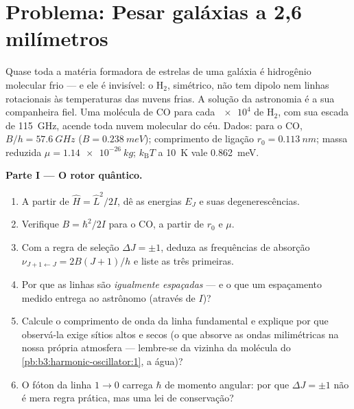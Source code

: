 \section{Problema: Pesar galáxias a 2,6 milímetros}

\begin{problem}\label{pb:b3:quantum-angular-momentum:1}
Quase toda a matéria formadora de estrelas de uma galáxia é hidrogênio
molecular frio --- e ele é invisível: o H$_2$, simétrico, não tem
dipolo nem linhas rotacionais às temperaturas das nuvens frias. A
solução da astronomia é a sua companheira fiel. Uma molécula de CO para
cada $\num{e4}$ de H$_2$, com sua escada de \qty{115}{GHz}, acende toda
nuvem molecular do céu. Dados: para o CO, $B/h = \qty{57.6}{GHz}$ ($B =
\qty{0.238}{meV}$); comprimento de ligação
$r_0 = \qty{0.113}{nm}$; massa reduzida $\mu = \qty{1.14e-26}{kg}$;
$k_{\text{B}}T$ a \qty{10}{K} vale \qty{0.862}{meV}.

\medskip\noindent\textbf{Parte I --- O rotor quântico.}
\begin{enumerate}
  \item A partir de $\hat H = \hat L^2/2I$, dê as energias $E_J$ e
        suas degenerescências.
  \item Verifique $B = \hbar^2/2I$ para o CO, a partir de $r_0$ e
        $\mu$.
  \item Com a regra de seleção $\Delta J = \pm1$, deduza as
        frequências de absorção $\nu_{J+1\leftarrow J} = 2B(J+1)/h$ e
        liste as três primeiras.
  \item Por que as linhas são \emph{igualmente espaçadas} --- e o que
        um espaçamento medido entrega ao astrônomo (através de $I$)?
  \item Calcule o comprimento de onda da linha fundamental e explique
        por que observá-la exige sítios altos e secos (o que absorve
        as ondas milimétricas na nossa própria atmosfera --- lembre-se
        da vizinha da molécula do
        \cref{pb:b3:harmonic-oscillator:1}, a água)?
  \item O fóton da linha $1 \to 0$ carrega $\hbar$ de momento angular:
        por que $\Delta J = \pm1$ não é mera regra prática, mas uma lei
        de conservação?
\end{enumerate}


\end{problem}
